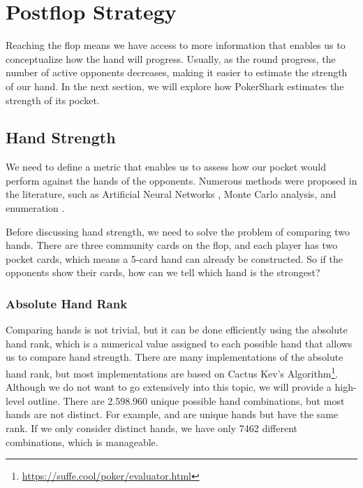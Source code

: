\section{Postflop Strategy}
Reaching the flop means we have access to more information that enables us to conceptualize how the hand will progress. Usually, as the round progress, the number of active opponents decreases, making it easier to estimate the strength of our hand. In the next section, we will explore how PokerShark estimates the strength of its pocket.

\subsection{Hand Strength}
We need to define a metric that enables us to assess how our pocket would perform against the hands of the opponents. Numerous methods were proposed in the literature, such as Artificial Neural Networks \cite{bensson2013predicting}, Monte Carlo analysis, and enumeration \cite{billings_challenge_2002}.

Before discussing hand strength, we need to solve the problem of comparing two hands. There are three community cards on the flop, and each player has two pocket cards, which means a 5-card hand can already be constructed. So if the opponents show their cards, how can we tell which hand is the strongest?

\subsubsection{Absolute Hand Rank}
Comparing hands is not trivial, but it can be done efficiently using the absolute hand rank, which is a numerical value assigned to each possible hand that allows us to compare hand strength.
There are many implementations of the absolute hand rank, but most implementations are based on Cactus Kev's Algorithm\footnote{\url{https://suffe.cool/poker/evaluator.html}}. Although we do not want to go extensively into this topic, we will provide a high-level outline. There are 2.598.960 unique possible hand combinations, but most hands are not distinct. For example,  and   are unique hands but have the same rank. If we only consider distinct hands, we have only 7462 different combinations, which is manageable.

